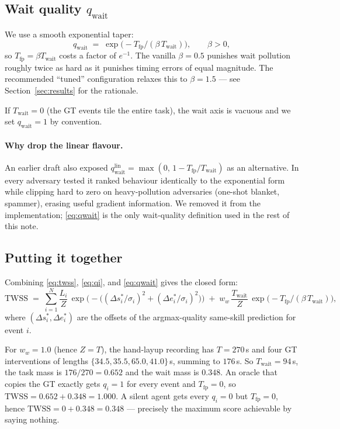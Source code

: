 \documentclass[11pt]{article}
\newcommand{\TWSS}{\mathrm{TWSS}}
\newcommand{\Tt}{T}
\newcommand{\Twait}{T_{\text{wait}}}
\newcommand{\Tfp}{T_{\text{fp}}}
\newcommand{\qi}{q_i}
\newcommand{\qwait}{q_{\text{wait}}}
\begin{document}
\subsection{Wait quality $\qwait$}
\label{sec:qwait}

We use a smooth exponential taper:
\begin{equation}
  \qwait \;=\; \exp\!\bigl(-\Tfp / (\beta\,\Twait)\bigr),
  \qquad \beta > 0,
  \label{eq:qwait}
\end{equation}
so $\Tfp = \beta \Twait$ costs a factor of $e^{-1}$. The vanilla
$\beta = 0.5$ punishes wait pollution roughly twice as hard as it
punishes timing errors of equal magnitude. The recommended ``tuned''
configuration relaxes this to $\beta = 1.5$ --- see
Section~\ref{sec:results} for the rationale.

If $\Twait = 0$ (the GT events tile the entire task), the wait axis is
vacuous and we set $\qwait = 1$ by convention.

\paragraph{Why drop the linear flavour.}
An earlier draft also exposed
$\qwait^{\text{lin}} = \max(0,\,1 - \Tfp / \Twait)$ as an
alternative. In every adversary tested it ranked behaviour
identically to the exponential form while clipping hard to zero on
heavy-pollution adversaries (one-shot blanket, spammer), erasing
useful gradient information. We removed it from the implementation;
\eqref{eq:qwait} is the only wait-quality definition used in the rest
of this note.

\subsection{Putting it together}

Combining \eqref{eq:twss}, \eqref{eq:qi}, and \eqref{eq:qwait}
gives the closed form:
\begin{equation}
  \TWSS \;=\; \sum_{i=1}^N \frac{L_i}{Z}\,
              \exp\!\bigl(-\bigl((\Delta s_i^*/\sigma_i)^2
                                 +(\Delta e_i^*/\sigma_i)^2\bigr)\bigr)
              \;+\; w_w\,\frac{\Twait}{Z}\,
              \exp\!\bigl(-\Tfp / (\beta\,\Twait)\bigr),
\end{equation}
where $(\Delta s_i^*, \Delta e_i^*)$ are the offsets of the
argmax-quality same-skill prediction for event $i$.

\begin{example}
For $w_w = 1.0$ (hence $Z = \Tt$), the hand-layup recording has
$\Tt = 270$\,s and four GT interventions of lengths
$\{34.5, 35.5, 65.0, 41.0\}$\,s, summing to $176$\,s. So $\Twait = 94$\,s,
the task mass is $176/270 = 0.652$ and the wait mass is $0.348$.
An oracle that copies the GT exactly gets $\qi = 1$ for every event and
$\Tfp = 0$, so $\TWSS = 0.652 + 0.348 = 1.000$. A silent agent gets every
$\qi = 0$ but $\Tfp = 0$, hence $\TWSS = 0 + 0.348 = 0.348$ --- precisely the
maximum score achievable by saying nothing.
\end{example}
\end{document}
